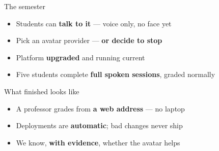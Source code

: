 \documentclass[aspectratio=169,11pt]{beamer}
\newcommand{\hl}[1]{\textcolor{ffcBlue}{\textbf{#1}}}
\begin{document}
\begin{frame}{The semester}
  \vspace{1.6em}
  \begin{center}
  \begin{minipage}{0.90\textwidth}\large
    \begin{itemize}\setlength{\itemsep}{0.9em}
      \item<1->[\textbf{\color{ffcBlue}29 Sep}] Students can \hl{talk to it} --- voice only, no face yet
      \item<2->[\textbf{\color{ffcBlue}20 Oct}] Pick an avatar provider --- \hl{or decide to stop}
      \item<3->[\textbf{\color{ffcBlue}27 Oct}] Platform \hl{upgraded} and running current
      \item<4->[\textbf{\color{ffcBlue}17 Nov}] Five students complete \hl{full spoken sessions}, graded normally
    \end{itemize}
  \end{minipage}
  \end{center}
  \vfill
  \begin{center}\normalsize
  \end{center}
  \vspace{0.8em}
\end{frame}

\begin{frame}{What finished looks like}
  \vspace{1.2em}
  \begin{center}
  \begin{minipage}{0.88\textwidth}\large
    \begin{itemize}\setlength{\itemsep}{0.8em}
      \item<1-> A professor grades from \hl{a web address} --- no laptop
      \item<2-> Deployments are \hl{automatic}; bad changes never ship
      \item<3-> We know, \hl{with evidence}, whether the avatar helps
    \end{itemize}
  \end{minipage}
  \end{center}
  \vspace{2.4em}
  \begin{center}
  \end{center}
  \vfill
\end{frame}
\end{document}
